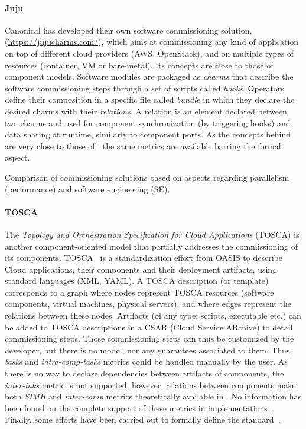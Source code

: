 \paragraph{Juju}
Canonical has developed their own software commissioning solution,
\juju (\url{https://jujucharms.com/}), which aims at commissioning any
kind of application on top of different cloud providers (\eg AWS,
OpenStack), and on multiple types of resources (container, VM or
bare-metal). Its concepts are close to those of component models. Software
modules are packaged as \juju \emph{charms} that describe the
software commissioning steps through a set of scripts called
\emph{hooks}. Operators define their composition in a specific file
called \emph{bundle} in which they declare the desired charms with
their \emph{relations}. A relation is an element declared between two
charms and used for component synchronization (by triggering hooks)
and data sharing at runtime, similarly to component ports. As the
concepts behind \juju are very close to those of \aeolus, the same
metrics are available barring the formal aspect.

\begin{table*}[tp]
  \centering
  \small
  
  \caption{Comparison of commissioning solutions based on aspects
  regarding parallelism (performance) and software engineering (SE).}
  \label{tab:comparison}
\end{table*}

\paragraph{TOSCA}
The \emph{Topology and Orchestration Specification for Cloud Applications} (TOSCA) is another component-oriented model that partially addresses the commissioning of its components. TOSCA~\cite{tosca:web,brogi2018} is a standardization effort from OASIS to describe Cloud applications, their components and their deployment artifacts, using standard languages (\ie XML, YAML). A TOSCA description (or template) corresponds to a graph where nodes represent TOSCA resources (\eg software components, virtual machines, physical servers), and where edges represent the relations between these nodes. Artifacts (of any type: scripts, executable etc.) can be added to TOSCA descriptions in a CSAR (Cloud Service ARchive) to detail commissioning steps. Those commissioning steps can thus be customized by the developer, but there is no model, nor any guarantees associated to them. Thus, \emph{tasks} and \emph{intra-comp-tasks} metrics could be handled manually by the user. As there is no way to declare dependencies between artifacts of components, the \emph{inter-taks} metric is not supported, however, relations between components make both \emph{SIMH} and \emph{inter-comp} metrics theoretically available in \tosca. No information has been found on the complete support of these metrics in \tosca implementations~\cite{cloudify:web,opentosca:web}. Finally, some efforts have been carried out to formally define the \tosca standard~\cite{7561358}.

